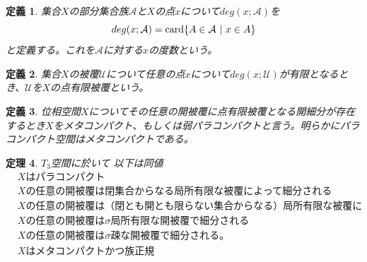 \documentclass[leqno]{jsarticle}
\newtheorem{thm}{定理}
\newtheorem{df}[thm]{定義}
\newcommand{\card}{\text{{\rm card}}}
\begin{document}
\begin{df}
集合$X$の部分集合族$\mathcal{A}$と$X$の点$x$について$deg(x;\mathcal{A})$を
\[
deg(x;\mathcal{A})=\card\{A\in \mathcal{A}\ |\ x\in A\}
\]
と定義する。これを$\mathcal{A}$に対する$x$の度数という。
\end{df}
\begin{df}
集合$X$の被覆$\mathcal{U}$について任意の点$x$について$deg(x;\mathcal{U})$が有限となるとき、$\mathcal{U}$を$X$の点有限被覆という。
\end{df}
\begin{df}
位相空間$X$についてその任意の開被覆に点有限被覆となる開細分が存在するとき$X$をメタコンパクト、もしくは弱パラコンパクトと言う。明らかにパラコンパクト空間はメタコンパクトである。
\end{df}


\begin{thm}\label{pp}$T_3$空間に於いて
以下は同値
\begin{align}
&\mbox{$X$はパラコンパクト}\\ 
&\mbox{$X$の任意の開被覆は閉集合からなる局所有限な被覆によって細分される}\\
&\mbox{$X$の任意の開被覆は（閉とも開とも限らない集合からなる）局所有限な被覆によって細分される}\\ 
&\mbox{$X$の任意の開被覆は$\sigma$局所有限な開被覆で細分される}\\
&\mbox{$X$の任意の開被覆は$\sigma$疎な開被覆で細分される。}\\
&\mbox{$X$はメタコンパクトかつ族正規}
\end{align}
\end{thm}
\end{document}
